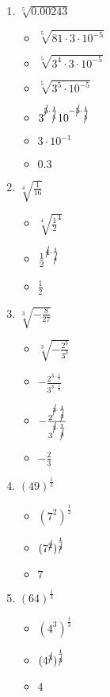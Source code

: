 \documentclass{article}
\begin{document}
\begin{onehalfspace}
\begin{enumerate}[start=15]
        \item $\sqrt[5]{0.00243}$
        \begin{itemize}
            \item $\sqrt[5]{81 \cdot 3 \cdot 10^{-5}}$
            \item $\sqrt[5]{3^{4} \cdot 3 \cdot 10^{-5}}$
            \item $\sqrt[5]{3^{5} \cdot 10^{-5}}$
            \item $3^{\cancel{5} \cdot \frac{1}{\cancel{5}}} 10^{-\cancel{5} \cdot \frac{1}{\cancel{5}}}$
            \item $3 \cdot 10^{-1}$
            \item $0.3$
        \end{itemize}

        \item $\sqrt[4]{\frac{1}{16}}$
        \begin{itemize}
            \item $\sqrt[4]{\frac{1}{2}^{4}}$
            \item $\frac{1}{2}^{\cancel{4} \cdot \frac{1}{\cancel{4}}}$
            \item $\frac{1}{2}$
        \end{itemize}

        \item $\sqrt[3]{-\frac{8}{27}}$
        \begin{itemize}
            \item $\sqrt[3]{-\frac{2^{3}}{3^{3}}}$
            \item $-\frac{2^{3 \cdot \frac{1}{3}}}{3^{3 \cdot \frac{1}{3}}}$
            \item $-\frac{2^{\cancel{3} \cdot \frac{1}{\cancel{3}}}}{3^{\cancel{3} \cdot \frac{1}{\cancel{3}}}}$
            \item $-\frac{2}{3}$
        \end{itemize}
        
        \item $(49)^{\frac{1}{2}}$
        \begin{itemize}
            \item $(7^{2})^{\frac{1}{2}}$
            \item $(7^{\cancel{2}})^{\frac{1}{\cancel{2}}}$
            \item $7$
        \end{itemize}

        \item $(64)^{\frac{1}{3}}$
        \begin{itemize}
            \item $(4^{3})^{\frac{1}{3}}$
            \item $(4^{\cancel{3}})^{\frac{1}{\cancel{3}}}$
            \item $4$
        \end{itemize}


\end{enumerate}
\end{onehalfspace}
\end{document}
